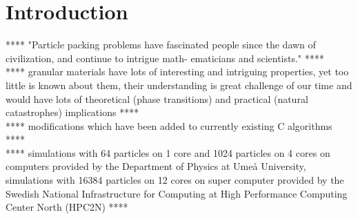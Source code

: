 \documentclass[class=report, float=false, crop=false]{standalone}
\begin{document}
\chapter*{Introduction}
\label{introduction}

**** "Particle packing problems have fascinated people since the dawn of civilization, and continue to intrigue math- ematicians and scientists." \cite{donev2004unusually} ****\\

**** granular materials have lots of interesting and intriguing properties, yet too little is known about them, their understanding is great challenge of our time and would have lots of theoretical (phase transitions) and practical (natural catastrophes) implications \cite{youtube4} ****\\

**** modifications which have been added to currently existing C algorithms ****\\

**** simulations with 64 particles on 1 core and 1024 particles on 4 cores on computers provided by the Department of Physics at Umeå University, simulations with 16384 particles on 12 cores on super computer provided by the Swedish National Infrastructure for Computing at High Performance Computing Center North (HPC2N) ****

% 
\end{document}
